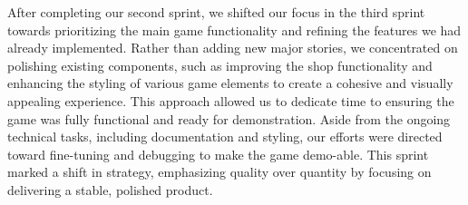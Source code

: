 \noindent After completing our second sprint, we shifted our focus in the third sprint towards prioritizing the main game functionality and refining the features we had already implemented. Rather than adding new major stories, we concentrated on polishing existing components, such as improving the shop functionality and enhancing the styling of various game elements to create a cohesive and visually appealing experience. This approach allowed us to dedicate time to ensuring the game was fully functional and ready for demonstration. Aside from the ongoing technical tasks, including documentation and styling, our efforts were directed toward fine-tuning and debugging to make the game demo-able. This sprint marked a shift in strategy, emphasizing quality over quantity by focusing on delivering a stable, polished product.

\begin{table}[htbp]
\centering
{}
\caption{Delegation of user stories amongst group members for sprint 3}
\end{table}